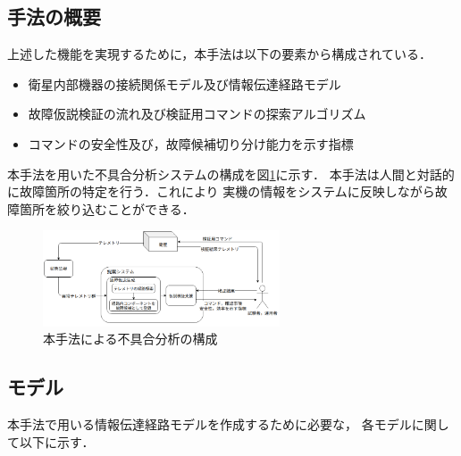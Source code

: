 \documentclass[11pt]{jsarticle}%
\begin{document}
\begin{multicols}{2}
\subsection{手法の概要}
\vspace{-1zh}
上述した機能を実現するために，本手法は以下の要素から構成されている．
\begin{itemize} %
  \item 衛星内部機器の接続関係モデル及び情報伝達経路モデル
  \item 故障仮説検証の流れ及び検証用コマンドの探索アルゴリズム%
  \item コマンドの安全性及び，故障候補切り分け能力を示す指標
\end{itemize}
本手法を用いた不具合分析システムの構成を図\ref{fig:whole_flow}に示す．
本手法は人間と対話的に故障箇所の特定を行う．これにより %
実機の情報をシステムに反映しながら故障箇所を絞り込むことができる．

\begin{figure}[H]
  \centering
    \includegraphics[width=7.0cm]{../figure/whole_flow.png}
    \caption{本手法による不具合分析の構成}
    \label{fig:whole_flow}
\end{figure}
\vspace{-1zh}
\subsection{モデル}
  \vspace{-1zh}
  本手法で用いる情報伝達経路モデルを作成するために必要な，
各モデルに関して以下に示す．

\end{multicols}
\end{document}
